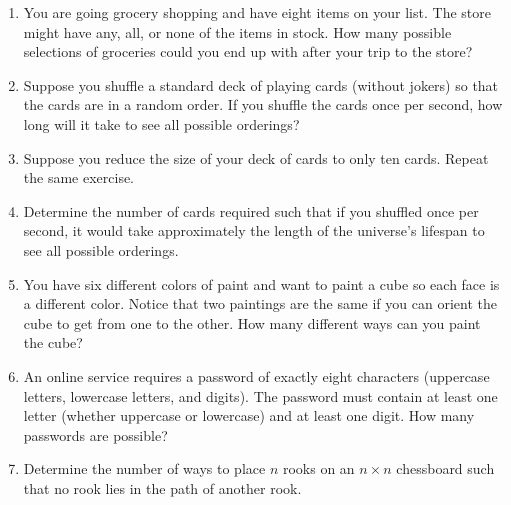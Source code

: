 \documentclass{book}
\theoremstyle{plain}
\theoremstyle{definition}
\newif\ifprintsolutions
\newcommand{\solution}[1]{\ifprintsolutions \begin{sloppypar}{\it #1}\end{sloppypar} \fi} %
\begin{document}
\begin{enumerate}
\item You are going grocery shopping and have eight items on your list. The store might have any, all, or none of the items in stock. How many possible selections of groceries could you end up with after your trip to the store? \solution{There are $2^8$ possible selections. There are two possibilities for each item: either the store has the item in stock or it does not.}
\item Suppose you shuffle a standard deck of playing cards (without jokers) so that the cards are in a random order. If you shuffle the cards once per second, how long will it take to see all possible orderings? \solution{There are $52! = 80658175170943878571660636856403766975289505440883277824000000000000 \approx 1.24 \times 10^{68}$ orderings. If you shuffle once per second, you will get all orderings in $8.066 \times 10^{67}$ seconds. For comparison, the universe is estimated to be $4.3 \times 10^{17}$ seconds old, so it would take $1.9 \times 10^{50}$ universe lifespans to get all orderings!}
\item Suppose you reduce the size of your deck of cards to only ten cards. Repeat the same exercise. \solution{Now there are $10! = 3628800 \approx 3.62 \times 10^6$ orderings. If you shuffle once per second, you will get all orderings in about six weeks.}
\item Determine the number of cards required such that if you shuffled once per second, it would take approximately the length of the universe's lifespan to see all possible orderings. \solution{It would take about $19$ (giving $0.28$ lifespans) or $20$ (giving $6$ lifespans) cards.}
\item You have six different colors of paint and want to paint a cube so each face is a different color. Notice that two paintings are the same if you can orient the cube to get from one to the other. How many different ways can you paint the cube? \solution{You can paint it in $6!/24 = 30$ ways since the cube has $24$ different orientations.}
\item An online service requires a password of exactly eight characters (uppercase letters, lowercase letters, and digits). The password must contain at least one letter (whether uppercase or lowercase) and at least one digit. How many passwords are possible? \solution{There are $62^8 - 10^8 - 52^8$ possible passwords.}
\item Determine the number of ways to place $n$ rooks on an $n \times n$ chessboard such that no rook lies in the path of another rook. \solution{There are $n!$ possible placements.}
\end{enumerate}
\end{document}
